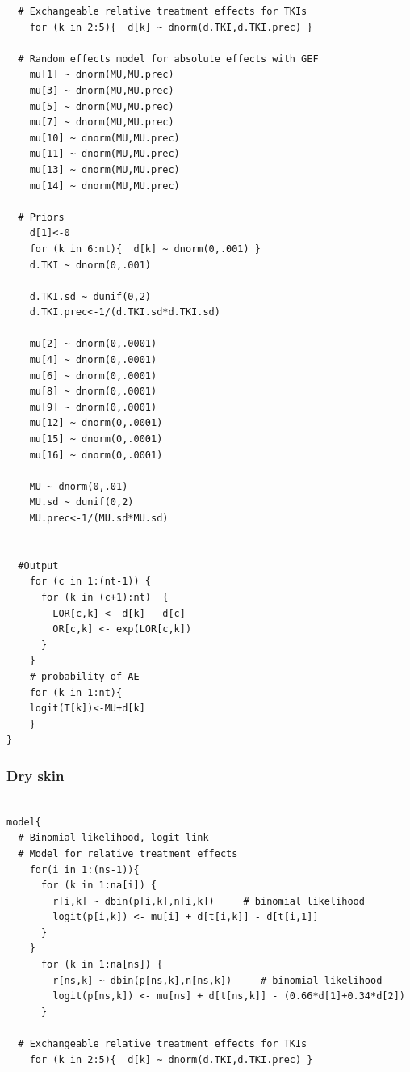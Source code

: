 \documentclass[11pt,final,fleqn]{article}\usepackage[]{graphicx}\usepackage[]{color}
\theoremstyle{plain}
\begin{document}
\begin{appendices}
\begin{verbatim}
  # Exchangeable relative treatment effects for TKIs
    for (k in 2:5){  d[k] ~ dnorm(d.TKI,d.TKI.prec) }
  
  # Random effects model for absolute effects with GEF
    mu[1] ~ dnorm(MU,MU.prec) 
    mu[3] ~ dnorm(MU,MU.prec) 
    mu[5] ~ dnorm(MU,MU.prec) 
    mu[7] ~ dnorm(MU,MU.prec) 
    mu[10] ~ dnorm(MU,MU.prec) 
    mu[11] ~ dnorm(MU,MU.prec) 
    mu[13] ~ dnorm(MU,MU.prec) 
    mu[14] ~ dnorm(MU,MU.prec) 
       
  # Priors
    d[1]<-0                                      
    for (k in 6:nt){  d[k] ~ dnorm(0,.001) }     
    d.TKI ~ dnorm(0,.001)
    
    d.TKI.sd ~ dunif(0,2) 
    d.TKI.prec<-1/(d.TKI.sd*d.TKI.sd)
    
    mu[2] ~ dnorm(0,.0001)                     
    mu[4] ~ dnorm(0,.0001)                       
    mu[6] ~ dnorm(0,.0001)                       
    mu[8] ~ dnorm(0,.0001)                       
    mu[9] ~ dnorm(0,.0001) 
    mu[12] ~ dnorm(0,.0001) 
    mu[15] ~ dnorm(0,.0001) 
    mu[16] ~ dnorm(0,.0001) 
      
    MU ~ dnorm(0,.01)                         
    MU.sd ~ dunif(0,2) 
    MU.prec<-1/(MU.sd*MU.sd)
    
      
  #Output                                        
    for (c in 1:(nt-1)) {                        
      for (k in (c+1):nt)  { 
        LOR[c,k] <- d[k] - d[c]
        OR[c,k] <- exp(LOR[c,k])
      }  
    }
    # probability of AE
    for (k in 1:nt){ 
    logit(T[k])<-MU+d[k]
    }
}

\end{verbatim}

\subsubsection{Dry skin} 
\begin{verbatim} 

model{
  # Binomial likelihood, logit link
  # Model for relative treatment effects
    for(i in 1:(ns-1)){                  
      for (k in 1:na[i]) {               
        r[i,k] ~ dbin(p[i,k],n[i,k])     # binomial likelihood
        logit(p[i,k]) <- mu[i] + d[t[i,k]] - d[t[i,1]]  
      }
    }   
      for (k in 1:na[ns]) {               
        r[ns,k] ~ dbin(p[ns,k],n[ns,k])     # binomial likelihood
        logit(p[ns,k]) <- mu[ns] + d[t[ns,k]] - (0.66*d[1]+0.34*d[2])  
      }
  
  # Exchangeable relative treatment effects for TKIs
    for (k in 2:5){  d[k] ~ dnorm(d.TKI,d.TKI.prec) }
  

\end{verbatim}
\end{appendices}
\end{document}
